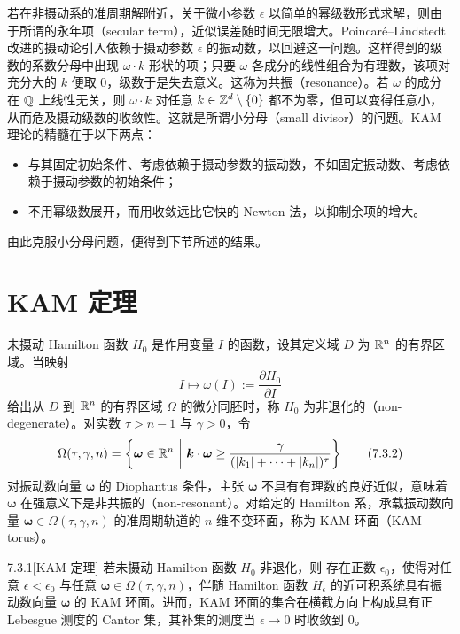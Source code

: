 若在非摄动系的准周期解附近，关于微小参数 $\epsilon$ 以简单的幂级数形式求解，则由于所谓的永年项（secular term），近似误差随时间无限增大。Poincaré--Lindstedt 改进的摄动论引入依赖于摄动参数 $\epsilon$ 的振动数，以回避这一问题。这样得到的级数的系数分母中出现 $\omega\cdot k$ 形状的项；只要 $\omega$ 各成分的线性组合为有理数，该项对充分大的 $k$ 便取 $0$，级数于是失去意义。这称为共振（resonance）。若 $\omega$ 的成分在 $\mathbb{Q}$ 上线性无关，则 $\omega\cdot k$ 对任意 $k\in\mathbb{Z}^d\setminus\{0\}$ 都不为零，但可以变得任意小，从而危及摄动级数的收敛性。这就是所谓小分母（small divisor）的问题。KAM 理论的精髓在于以下两点：
\begin{itemize}
  \item 与其固定初始条件、考虑依赖于摄动参数的振动数，不如固定振动数、考虑依赖于摄动参数的初始条件；
  \item 不用幂级数展开，而用收敛远比它快的 Newton 法，以抑制余项的增大。
\end{itemize}
由此克服小分母问题，便得到下节所述的结果。


\section{KAM 定理}

未摄动 Hamilton 函数 $H_0$ 是作用变量 $I$ 的函数，设其定义域 $D$ 为 $\mathbb{R}^n$ 的有界区域。当映射
\begin{equation}
  I\mapsto\omega(I):=\frac{\partial H_0}{\partial I}
  \tag{7.3.1}
\end{equation}
给出从 $D$ 到 $\mathbb{R}^n$ 的有界区域 $\Omega$ 的微分同胚时，称 $H_0$ 为非退化的（non-degenerate）。对实数 $\tau>n-1$ 与 $\gamma>0$，令
\begin{equation}
  \Omega(\tau,\gamma,n)
  =\left\{\bm{\omega}\in\mathbb{R}^n\ \middle|\
  \bm{k}\cdot\bm{\omega}\ge\frac{\gamma}{(|k_1|+\cdots+|k_n|)^{\tau}}\right\}
  \tag{7.3.2}
\end{equation}
对振动数向量 $\bm{\omega}$ 的 Diophantus 条件，主张 $\bm{\omega}$ 不具有有理数的良好近似，意味着 $\bm{\omega}$ 在强意义下是非共振的（non-resonant）。对给定的 Hamilton 系，承载振动数向量 $\bm{\omega}\in\Omega(\tau,\gamma,n)$ 的准周期轨道的 $n$ 维不变环面，称为 KAM 环面（KAM torus）。

\begin{theorem}{7.3.1}[KAM 定理]
若未摄动 Hamilton 函数 $H_0$ 非退化，则
存在正数 $\epsilon_0$，使得对任意 $\epsilon<\epsilon_0$ 与任意 $\bm{\omega}\in\Omega(\tau,\gamma,n)$，伴随 Hamilton 函数 $H_{\epsilon}$ 的近可积系统具有振动数向量 $\bm{\omega}$ 的 KAM 环面。进而，KAM 环面的集合在横截方向上构成具有正 Lebesgue 测度的 Cantor 集，其补集的测度当 $\epsilon\to0$ 时收敛到 $0$。
\end{theorem}


